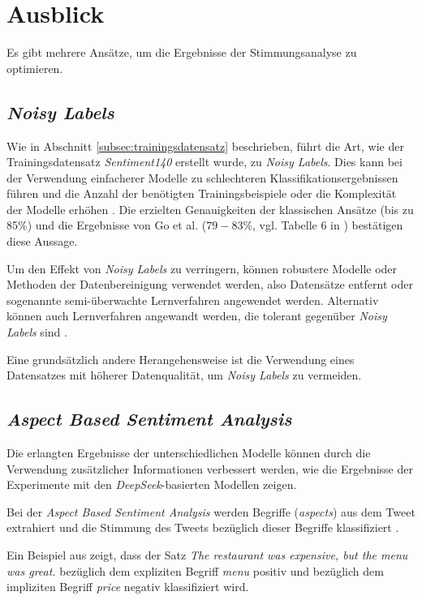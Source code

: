 \section{Ausblick}\label{sec:ausblick}

Es gibt mehrere Ansätze, um die Ergebnisse der Stimmungsanalyse zu optimieren.

\subsection{\textit{Noisy Labels}}
Wie in Abschnitt \ref{subsec:trainingsdatensatz} beschrieben, führt die Art, wie der Trainingsdatensatz \textit{Sentiment140} erstellt wurde, zu \textit{Noisy Labels}.
Dies kann bei der Verwendung einfacherer Modelle zu schlechteren Klassifikationsergebnissen führen und die Anzahl der benötigten Trainingsbeispiele oder die Komplexität der Modelle erhöhen \cite{NoisyLabel2014}.
Die erzielten Genauigkeiten der klassischen Ansätze (bis zu 85\%) und die Ergebnisse von  Go et al. ($79-83\%$, vgl. Tabelle 6 in \cite{go2009twitter}) bestätigen diese Aussage.

Um den Effekt von \textit{Noisy Labels} zu verringern, können robustere Modelle oder Methoden der Datenbereinigung verwendet werden, also Datensätze entfernt oder sogenannte semi-überwachte Lernverfahren angewendet werden. Alternativ können auch Lernverfahren angewandt werden, die tolerant gegenüber \textit{Noisy Labels} sind \cite[Abschn. 3]{NoisyLabel2014}.

Eine grundsätzlich andere Herangehensweise ist die Verwendung eines Datensatzes mit höherer Datenqualität, um \textit{Noisy Labels} zu vermeiden.

\subsection{\textit{Aspect Based Sentiment Analysis}}

Die erlangten Ergebnisse der unterschiedlichen Modelle können durch die Verwendung zusätzlicher Informationen verbessert werden, wie die Ergebnisse der Experimente mit den \textit{DeepSeek}-basierten Modellen zeigen.

Bei der \textit{Aspect Based Sentiment Analysis} werden Begriffe (\textit{aspects}) aus dem Tweet extrahiert und die Stimmung des Tweets bezüglich dieser Begriffe klassifiziert \cite{Hua_2024}.

Ein Beispiel aus \cite{Hua_2024} zeigt, dass der Satz \glqq \textit{The restaurant was expensive, but the menu was great.}\grqq{} bezüglich dem expliziten Begriff \textit{menu} positiv und bezüglich dem impliziten Begriff \textit{price} negativ klassifiziert wird.

